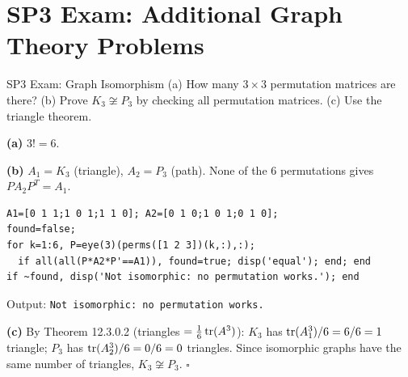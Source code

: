 \section*{SP3 Exam: Additional Graph Theory Problems}

\begin{exercise}{SP3 Exam: Graph Isomorphism}
(a) How many $3\times3$ permutation matrices are there? (b) Prove $K_3\not\cong P_3$ by checking all permutation matrices. (c) Use the triangle theorem.
\end{exercise}
\begin{solution}
\textbf{(a)} $3!=6$.

\textbf{(b)} $A_1=K_3$ (triangle), $A_2=P_3$ (path). None of the 6 permutations gives $PA_2P^T=A_1$.
\begin{lstlisting}
A1=[0 1 1;1 0 1;1 1 0]; A2=[0 1 0;1 0 1;0 1 0];
found=false;
for k=1:6, P=eye(3)(perms([1 2 3])(k,:),:);
  if all(all(P*A2*P'==A1)), found=true; disp('equal'); end; end
if ~found, disp('Not isomorphic: no permutation works.'); end
\end{lstlisting}
Output: \texttt{Not isomorphic: no permutation works.}

\textbf{(c)} By Theorem 12.3.0.2 (triangles $=\tfrac{1}{6}\operatorname{tr}(A^3)$): $K_3$ has $\operatorname{tr}(A_1^3)/6=6/6=1$ triangle; $P_3$ has $\operatorname{tr}(A_2^3)/6=0/6=0$ triangles. Since isomorphic graphs have the same number of triangles, $K_3\not\cong P_3$. $\square$
\end{solution}

